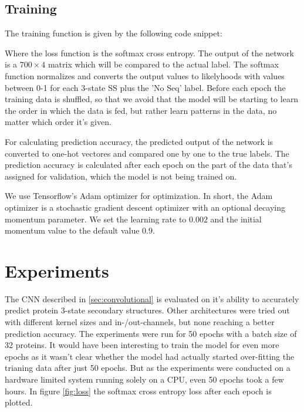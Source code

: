 \documentclass{article}
\begin{document}
\subsection{Training}  
The training function is given by the following code snippet:



Where the loss function is the softmax cross entropy. The output of the network is a $700\times4$ matrix which will be compared to the actual label. The softmax function normalizes and converts the output values to likelyhoods with values between 0-1 for each 3-state SS plus the 'No Seq' label. Before each epoch the training data is shuffled, so that we avoid that the model will be starting to learn the order in which the data is fed, but rather learn patterns in the data, no matter which order it's given.

For calculating prediction accuracy, the predicted output of the network is converted to one-hot vectores and compared one by one to the true labels. The prediction accuracy is calculated after each epoch on the part of the data that's assigned for validation, which the model is not being trained on.

We use Tensorflow's Adam optimizer for optimization. In short, the Adam optimizer is a stochastic gradient descent optimizer with an optional decaying momentum parameter. We set the learning rate to $0.002$ and the initial momentum value to the default value $0.9$.

\section{Experiments}
\label{sec:experiments}
The CNN described in \ref{sec:convolutional} is evaluated on it's ability to accurately predict protein 3-state secondary structures. Other architectures were tried out with different kernel sizes and in-/out-channels, but none reaching a better prediction accuracy. The experiments were run for 50 epochs with a batch size of 32 proteins. It would have been interesting to train the model for even more epochs as it wasn't clear whether the model had actually started over-fitting the trianing data after just 50 epochs. But as the experiments were conducted on a hardware limited system running solely on a CPU, even 50 epochs took a few hours. In figure \ref{fig:loss} the softmax cross entropy loss after each epoch is plotted.    
\end{document}
